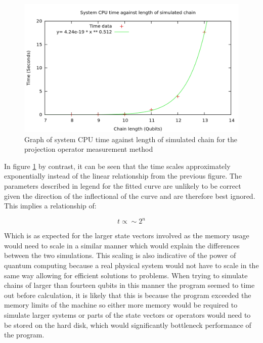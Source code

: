 \begin{figure}
\centering
\includegraphics[scale=0.20]{gfx/timings2.jpg}
\caption{Graph of system CPU time against length of simulated chain for the projection operator measurement method \label{fig:length_v_time_2}}
\end{figure}

In figure \ref{fig:length_v_time_2} by contrast, it can be seen that the time scales approximately exponentially instead of the linear relationship from the previous figure. The parameters described in legend for the fitted curve are unlikely to be correct given the direction of the inflectional of the curve and are therefore best ignored. This implies a relationship of:

\begin{equation}
t \propto  \sim 2^{n}
\end{equation}


Which is as expected for the larger state vectors involved as the memory usage would need to scale in a similar manner which would explain the differences between the two simulations. This scaling is also indicative of the power of quantum computing because a real physical system would not have to scale in the same way allowing for efficient solutions to problems. When trying to simulate chains of larger than fourteen qubits in this manner the program seemed to time out before calculation, it is likely that this is because the program exceeded the memory limits of the machine so either more memory would be required to simulate larger systems or parts of the state vectors or operators would need to be stored on the hard disk, which would significantly bottleneck performance of the program.

